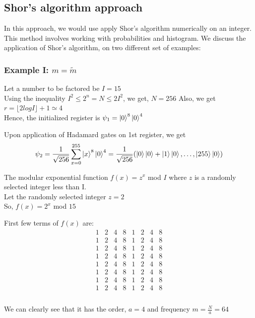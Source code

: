 \subsection{Shor's algorithm approach}
In this approach, we would use apply Shor's algorithm numerically on an integer. This method involves working with probabilities and histogram. We discuss the application of Shor's algorithm, on two different set of examples:
\subsubsection{Example I: $m=\tilde{m}$}
Let a number to be factored be $I= 15$
\\ Using the inequality $I^2 \leq 2^n = N \leq 2I^2$, we get, $N=256$
Also, we get $r= \lfloor 2logI \rfloor +1 \simeq 4$
\\ Hence, the initialized register is $\psi_1 = \ket{0}^8\ket{0}^4$

Upon application of Hadamard gates on 1st register, we get
$$\psi_2 = \frac{1}{\sqrt{256}} \sum_{x=0}^{255} \ket{x}^8\ket{0}^4 = \frac{1}{\sqrt{256}} (\ket{0}\ket{0} + \ket{1}\ket{0},\dots , \ket{255}\ket{0}) $$

The modular exponential function $f(x)= z^x$ mod $I$ where $z$ is a randomly selected integer less than I.
\\Let the randomly selected integer $z=2$
\\So, $f(x) = 2^x$ mod $15 $

First few terms of $f(x)$ are:
{\scriptsize $$\begin{matrix}
      1  &   2  &   4  &   8  &   1  &   2  &   4  &   8 \\
  1  &   2  &   4  &   8  &   1  &   2  &   4  &   8 \\
  1  &   2  &   4  &   8  &   1  &   2  &   4  &   8 \\
  1  &   2  &   4  &   8  &   1  &   2  &   4  &   8 \\
  1  &   2  &   4  &   8  &   1  &   2  &   4  &   8 \\
  1  &   2  &   4  &   8  &   1  &   2  &   4  &   8 \\
  1  &   2  &   4  &   8  &   1  &   2  &   4  &   8 \\
  1  &   2  &   4  &   8  &   1  &   2  &   4  &   8 \\
  
\end{matrix}$$}
\\We can clearly see that it has the order, $a=4$ and frequency $m = \frac{N}{a}= 64$

